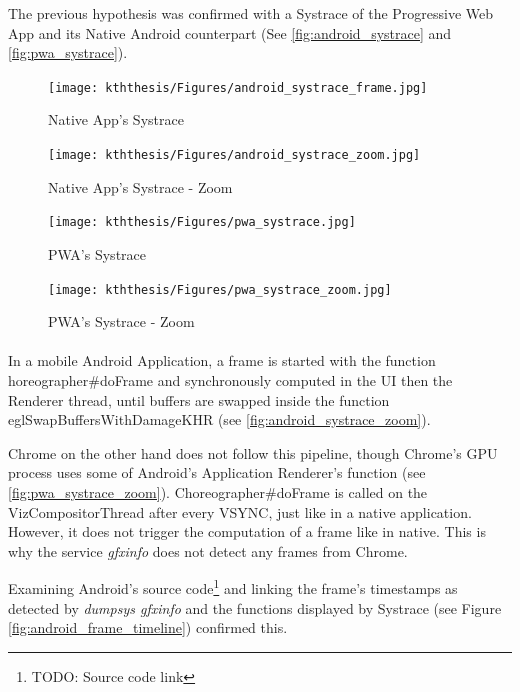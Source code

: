 \documentclass{kththesis}
\begin{document}
    
    The previous hypothesis was confirmed with a Systrace of the Progressive Web App and its Native Android counterpart (See  \autoref{fig:android_systrace} and \autoref{fig:pwa_systrace}).
    \begin{figure}[!ht]
        \texttt{[image: kththesis/Figures/android\_systrace\_frame.jpg]}
        \caption{Native App's Systrace}
        \label{fig:android_systrace}
        \texttt{[image: kththesis/Figures/android\_systrace\_zoom.jpg]}
        \caption{Native App's Systrace - Zoom}
        \label{fig:android_systrace_zoom}
    \end{figure}
    
    \begin{figure}[!ht]
        \centering
        \texttt{[image: kththesis/Figures/pwa\_systrace.jpg]}
        \caption{PWA's Systrace}
        \label{fig:pwa_systrace}
        \texttt{[image: kththesis/Figures/pwa\_systrace\_zoom.jpg]}
        \caption{PWA's Systrace - Zoom}
        \label{fig:pwa_systrace_zoom}
    \end{figure}
    
    \paragraph{}
    In a mobile Android Application, a frame is started with the function horeographer\#doFrame and synchronously computed in the UI then the Renderer thread, until buffers are swapped inside the function eglSwapBuffersWithDamageKHR (see \autoref{fig:android_systrace_zoom}).
    
    Chrome on the other hand does not follow this pipeline, though Chrome's GPU process uses some  of Android's Application Renderer's function (see \autoref{fig:pwa_systrace_zoom}). Choreographer\#doFrame is called on the VizCompositorThread after every VSYNC, just like in a native application. However, it does not trigger the computation of a frame like in native. This is  why the service \textit{gfxinfo} does not detect any frames from Chrome. 
    
    Examining Android's source code\footnote{TODO: Source code link} and linking the frame's timestamps as detected by \textit{dumpsys gfxinfo} and the functions displayed by Systrace (see Figure \ref{fig:android_frame_timeline}) confirmed this.
    
\end{document}
